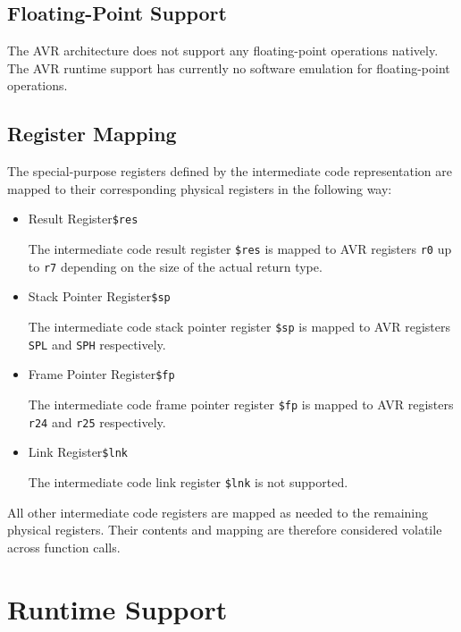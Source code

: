 \subsection{Floating-Point Support}

The AVR architecture does not support any floating-point operations natively.
The AVR runtime support has currently no software emulation for floating-point operations.

\subsection{Register Mapping}

The special-purpose registers defined by the intermediate code representation are mapped to their corresponding physical registers in the following way:

\begin{itemize}

\item Result Register\alignright\texttt{\$res}\nopagebreak

The intermediate code result register \texttt{\$res} is mapped to AVR registers \texttt{r0} up to \texttt{r7} depending on the size of the actual return type.

\item Stack Pointer Register\alignright\texttt{\$sp}\nopagebreak

The intermediate code stack pointer register \texttt{\$sp} is mapped to AVR registers \texttt{SPL} and \texttt{SPH} respectively.

\item Frame Pointer Register\alignright\texttt{\$fp}\nopagebreak

The intermediate code frame pointer register \texttt{\$fp} is mapped to AVR registers \texttt{r24} and \texttt{r25} respectively.

\item Link Register\alignright\texttt{\$lnk}\nopagebreak

The intermediate code link register \texttt{\$lnk} is not supported.

\end{itemize}

All other intermediate code registers are mapped as needed to the remaining physical registers.
Their contents and mapping are therefore considered volatile across function calls.

\section{Runtime Support}

